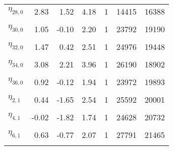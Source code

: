 \begin{longtable}[t]{lrrrrrr}
$\eta_{28,  0}$ & 2.83 & 1.52 & 4.18 & 1 & 14415 & 16388\\
\cellcolor{gray!6}{$\eta_{29,  0}$} & \cellcolor{gray!6}{1.65} & \cellcolor{gray!6}{1.00} & \cellcolor{gray!6}{2.30} & \cellcolor{gray!6}{1} & \cellcolor{gray!6}{30901} & \cellcolor{gray!6}{21277}\\
$\eta_{30,  0}$ & 1.05 & -0.10 & 2.20 & 1 & 23792 & 19190\\
\cellcolor{gray!6}{$\eta_{31,  0}$} & \cellcolor{gray!6}{2.35} & \cellcolor{gray!6}{1.19} & \cellcolor{gray!6}{3.51} & \cellcolor{gray!6}{1} & \cellcolor{gray!6}{26209} & \cellcolor{gray!6}{18625}\\
$\eta_{32,  0}$ & 1.47 & 0.42 & 2.51 & 1 & 24976 & 19448\\
\cellcolor{gray!6}{$\eta_{33,  0}$} & \cellcolor{gray!6}{3.94} & \cellcolor{gray!6}{2.65} & \cellcolor{gray!6}{5.18} & \cellcolor{gray!6}{1} & \cellcolor{gray!6}{12412} & \cellcolor{gray!6}{13985}\\
$\eta_{34,  0}$ & 3.08 & 2.21 & 3.96 & 1 & 26190 & 18902\\
\cellcolor{gray!6}{$\eta_{35,  0}$} & \cellcolor{gray!6}{1.51} & \cellcolor{gray!6}{0.40} & \cellcolor{gray!6}{2.59} & \cellcolor{gray!6}{1} & \cellcolor{gray!6}{24300} & \cellcolor{gray!6}{19792}\\
$\eta_{36,  0}$ & 0.92 & -0.12 & 1.94 & 1 & 23972 & 19893\\
\cellcolor{gray!6}{$\eta_{1,  1}$} & \cellcolor{gray!6}{0.40} & \cellcolor{gray!6}{-1.16} & \cellcolor{gray!6}{1.93} & \cellcolor{gray!6}{1} & \cellcolor{gray!6}{26821} & \cellcolor{gray!6}{18974}\\
$\eta_{2,  1}$ & 0.44 & -1.65 & 2.54 & 1 & 25592 & 20001\\
\cellcolor{gray!6}{$\eta_{3,  1}$} & \cellcolor{gray!6}{2.10} & \cellcolor{gray!6}{0.42} & \cellcolor{gray!6}{3.87} & \cellcolor{gray!6}{1} & \cellcolor{gray!6}{13884} & \cellcolor{gray!6}{17298}\\
$\eta_{4,  1}$ & -0.02 & -1.82 & 1.74 & 1 & 24628 & 20732\\
\cellcolor{gray!6}{$\eta_{5,  1}$} & \cellcolor{gray!6}{-0.73} & \cellcolor{gray!6}{-2.69} & \cellcolor{gray!6}{1.11} & \cellcolor{gray!6}{1} & \cellcolor{gray!6}{19865} & \cellcolor{gray!6}{18555}\\
$\eta_{6,  1}$ & 0.63 & -0.77 & 2.07 & 1 & 27791 & 21465\\
\cellcolor{gray!6}{$\eta_{7,  1}$} & \cellcolor{gray!6}{2.44} & \cellcolor{gray!6}{0.06} & \cellcolor{gray!6}{5.14} & \cellcolor{gray!6}{1} & \cellcolor{gray!6}{11960} & \cellcolor{gray!6}{16274}\\

\end{longtable}
